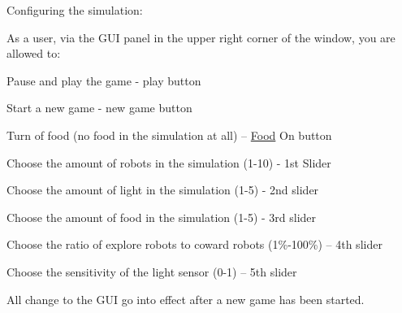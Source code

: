 Configuring the simulation\+:

As a user, via the G\+UI panel in the upper right corner of the window, you are allowed to\+:


\begin{DoxyItemize}
\item Pause and play the game -\/ play button
\item Start a new game -\/ new game button
\item Turn of food (no food in the simulation at all) – \hyperlink{class_food}{Food} On button
\item Choose the amount of robots in the simulation (1-\/10) -\/ 1st Slider
\item Choose the amount of light in the simulation (1-\/5) -\/ 2nd slider
\item Choose the amount of food in the simulation (1-\/5) -\/ 3rd slider
\item Choose the ratio of explore robots to coward robots (1\%-\/100\%) – 4th slider
\item Choose the sensitivity of the light sensor (0-\/1) – 5th slider
\end{DoxyItemize}

All change to the G\+UI go into effect after a new game has been started. 